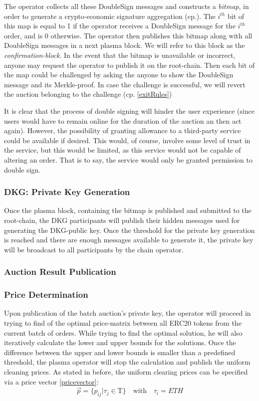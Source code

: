 \documentclass[11pt,parskip=full]{scrartcl}%
\newcommand{\Tau}{\mathrm{T}}
\newcommand*{\erc}{ERC20 }
\begin{document}
The operator collects all these DoubleSign messages and constructs a \emph{bitmap}, in order to generate a crypto-economic signature aggregation (cp.\cite{sig}). 
The $i^{th}$ bit of this map is equal to 1 if the operator receives a DoubleSign message for the $i^{th}$ order, and is 0 otherwise.
The operator then publishes this bitmap along with all DoubleSign messages in a next plasma block. We will refer to this block as the \emph{confirmation-block}.\newline
In the event that the bitmap is unavailable or incorrect, anyone may request the operator to publish it on the root-chain.
Then each bit of the map could be challenged by asking the anyone to show the DoubleSign message and its Merkle-proof. 
In case the challenge is successful, we will revert the auction belonging to the challenge (cp. \ref{exitRules})


It is clear that the process of double signing will hinder the user experience (since users would have to remain online for the duration of the auction an then act again). 
However, the possibility of granting allowance to a third-party service could be available if desired.
This would, of course, involve some level of trust in the service, but this would be limited, as this service would not be capable of altering an order. That is to say, the service would only be granted permission to double sign.

\subsubsection{DKG: Private Key Generation}
Once the plasma block, containing the bitmap is published and submitted to the root-chain, the DKG participants will publish their hidden messages used for generating the DKG-public key. 
Once the threshold for the private key generation is reached and there are enough messages available to generate it, the private key will be broadcast to all participants by the chain operator.
\subsubsection{Auction Result Publication}
\subsubsection*{Price Determination}
Upon publication of the batch auction's private key, the operator will proceed in trying to find of the optimal price-matrix between all \erc tokens from the current batch of orders. 
While trying to find the optimal solution, he will also iteratively calculate the lower and upper bounds for the solutions. Once the difference between the upper and lower bounds is smaller than a predefined threshold, the plasma operator will stop the calculation and publish the uniform cleaning prices.\newline
As stated in before, the uniform clearing prices can be specified via a price vector \ref{pricevector}:
\begin{equation}
\vec{p}=\{ p_{ij}| \tau_j \in \Tau \} \quad \text{with} \quad \tau_i =ETH
\end{equation}
\end{document}
